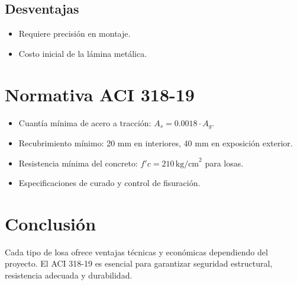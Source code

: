 \documentclass[12pt,a4paper]{article}
\begin{document}
	\subsection{Desventajas}
	\begin{itemize}
		\item Requiere precisión en montaje.
		\item Costo inicial de la lámina metálica.
	\end{itemize}
	
	\section{Normativa ACI 318-19}
	\begin{itemize}
		\item Cuantía mínima de acero a tracción: $A_s = 0.0018 \cdot A_g$.
		\item Recubrimiento mínimo: 20 mm en interiores, 40 mm en exposición exterior.
		\item Resistencia mínima del concreto: $f'c = 210 \, \text{kg/cm}^2$ para losas.
		\item Especificaciones de curado y control de fisuración.
	\end{itemize}
	
	\section{Conclusión}
	Cada tipo de losa ofrece ventajas técnicas y económicas dependiendo del proyecto. El ACI 318-19 es esencial para garantizar seguridad estructural, resistencia adecuada y durabilidad.
	
\end{document}
